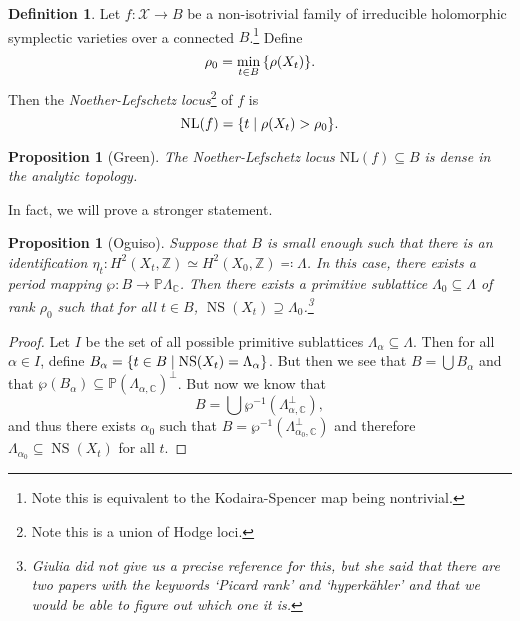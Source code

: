 \documentclass[leqno, openany]{memoir}
\newtheorem{prop}[thm]{Proposition}
\theoremstyle{definition}
\newtheorem{defn}[thm]{Definition}
\theoremstyle{remark}
\theoremstyle{plain}
\theoremstyle{definition}
\theoremstyle{remark}
\newcommand{\C}{\mathbb{C}}
\newcommand{\Z}{\mathbb{Z}}
\renewcommand{\P}{\mathbb{P}}
\newcommand{\mc}[1]{\mathcal{#1}}
\newcommand{\mr}[1]{\mathrm{#1}}
\DeclareMathOperator{\NS}{NS}
\begin{document}
\begin{defn}
    Let $f \colon \mc{X} \to B$ be a non-isotrivial family of irreducible holomorphic symplectic varieties over a connected $B$.\footnote{Note this is equivalent to the Kodaira-Spencer map being nontrivial.} Define
    \[ \rho_0 = \min_{t \in B} \qty{\rho(X_t)}. \]
    Then the \textit{Noether-Lefschetz locus}\footnote{Note this is a union of Hodge loci.} of $f$ is
    \[ \mr{NL}(f) = \qty{t \mid \rho(X_t) > \rho_0}. \]
\end{defn}

\begin{prop}[Green]
    The Noether-Lefschetz locus $\mr{NL}(f) \subseteq B$ is dense in the analytic topology.
\end{prop}

In fact, we will prove a stronger statement.

\begin{prop}[Oguiso]
    Suppose that $B$ is small enough such that there is an identification $\eta_t \colon H^2(X_t, \Z) \simeq H^2(X_0, \Z) \eqqcolon \Lambda$. In this case, there exists a period mapping $\wp \colon B \to \P \Lambda_{\C}$. Then there exists a primitive sublattice $\Lambda_0 \subseteq \Lambda$ of rank $\rho_0$ such that for all $t \in B$, $\NS(X_t) \supseteq \Lambda_0$.\footnote{Giulia did not give us a precise reference for this, but she said that there are two papers with the keywords `Picard rank' and `hyperk\"ahler' and that we would be able to figure out which one it is.}
\end{prop}

\begin{proof}
    Let $I$ be the set of all possible primitive sublattices $\Lambda_{\alpha} \subseteq \Lambda$. Then for all $\alpha \in I$, define $B_{\alpha} = \qty{t \in B \mid \NS(X_t) = \Lambda_{\alpha}}$. But then we see that $B = \bigcup B_{\alpha}$ and that $\wp(B_{\alpha}) \subseteq \P {(\Lambda_{\alpha, \C})}^{\perp}$. But now we know that
    \[ B = \bigcup \wp^{-1} (\Lambda_{\alpha, \C}^{\perp}), \]
    and thus there exists $\alpha_0$ such that $B = \wp^{-1}(\Lambda_{\alpha_0, \C}^{\perp})$ and therefore $\Lambda_{\alpha_0} \subseteq \NS(X_t)$ for all $t$.
\end{proof}
\end{document}
